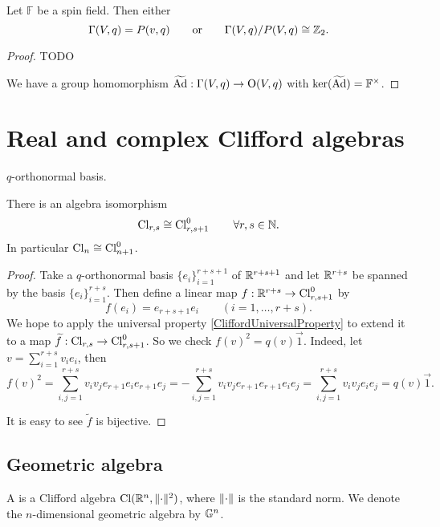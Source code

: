 \begin{proposition}
Let $\mathbb{F}$ be a spin field. Then either
\[ \Gamma(V,q)=P(v,q) \qquad \text{or} \qquad \Gamma(V,q)/P(V,q) \cong \mathbb{Z}_2. \]
\end{proposition}
\begin{proof}
TODO

We have a group homomorphism $\widetilde{\operatorname{Ad}}: \Gamma(V,q)\to \operatorname{O}(V,q)$ with $\ker(\widetilde{\operatorname{Ad}}) = \mathbb{F}^\times$. 
\end{proof}

\section{Real and complex Clifford algebras}

\begin{definition}
$q$-orthonormal basis.
\end{definition}

\begin{proposition}
There is an algebra isomorphism
\[ \operatorname{Cl}_{r,s} \cong \operatorname{Cl}^0_{r,s+1} \qquad \forall r,s\in\mathbb{N}. \]
In particular $\operatorname{Cl}_n \cong \operatorname{Cl}^0_{n+1}$.
\end{proposition}
\begin{proof}
Take a $q$-orthonormal basis $\{e_i\}_{i=1}^{r+s+1}$ of $\mathbb{R}^{r+s+1}$ and let $\mathbb{R}^{r+s}$ be spanned by the basis $\{e_i\}_{i=1}^{r+s}$. Then define a linear map $f:\mathbb{R}^{r+s}\to \operatorname{Cl}^0_{r,s+1}$ by
\[ f(e_i) = e_{r+s+1}e_i \qquad (i=1,\ldots,r+s). \]
We hope to apply the universal property \ref{CliffordUniversalProperty} to extend it to a map $\widetilde{f}: \operatorname{Cl}_{r,s}\to \operatorname{Cl}^0_{r,s+1}$. So we check $f(v)^2 = q(v) \vec{1}$. Indeed, let $v = \sum_{i=1}^{r+s}v_ie_i$, then
\[ f(v)^2 = \sum_{i,j=1}^{r+s}v_iv_je_{r+1}e_ie_{r+1}e_j = -\sum_{i,j=1}^{r+s}v_iv_je_{r+1}e_{r+1}e_ie_j = \sum_{i,j=1}^{r+s}v_iv_je_ie_j = q(v) \vec{1}. \]

It is easy to see $\widetilde{f}$ is bijective.
\end{proof}


\subsection{Geometric algebra}
\begin{definition}
A  is a Clifford algebra $\operatorname{Cl}(\mathbb{R}^n, \lVert\cdot\rVert^2)$, where $\lVert\cdot\rVert$ is the standard norm. We denote the $n$-dimensional geometric algebra by $\mathbb{G}^n$.
\end{definition}

